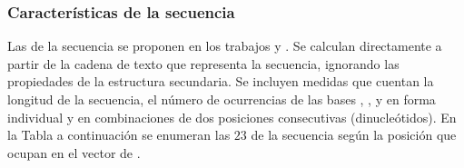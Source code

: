 %
%
\subsubsection{Características de la secuencia}
%
Las  de la secuencia se proponen en los trabajos 
\cite{ng} y  \cite{batuwita}.
Se calculan directamente a partir de la cadena de texto que representa
la secuencia, ignorando las propiedades de la estructura secundaria.
Se incluyen medidas que cuentan la longitud de la secuencia, el número
de ocurrencias de las bases \ntA{}, \ntG{}, \ntC{} y \ntU{} en forma individual
y en combinaciones de dos posiciones consecutivas (dinucleótidos).
En la Tabla a continuación se enumeran las $23$  de la
secuencia \cite{ng,batuwita} según la posición que ocupan en el vector
de .
